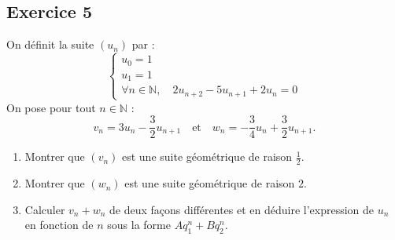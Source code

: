 \documentclass[11pt,a4paper]{article}
\newcommand{\N}{\mathbb{N}}
\begin{document}
\subsection*{Exercice 5}
On définit la suite $(u_n)$ par :
\[
\begin{cases}
u_0 = 1\\
u_1 = 1\\
\forall n \in \N, \quad 2u_{n+2} - 5u_{n+1} + 2u_n = 0
\end{cases}
\]
On pose pour tout $n \in \N$ :
\[
v_n = 3u_n - \frac{3}{2}u_{n+1} \quad \text{et} \quad w_n = -\frac{3}{4}u_n + \frac{3}{2}u_{n+1}.
\]
\begin{enumerate}
    \item Montrer que $(v_n)$ est une suite géométrique de raison $\frac{1}{2}$.
    \item Montrer que $(w_n)$ est une suite géométrique de raison $2$.
    \item Calculer $v_n + w_n$ de deux façons différentes et en déduire l'expression de $u_n$ en fonction de $n$ sous la forme $A q_1^n + B q_2^n$.
\end{enumerate}
\end{document}
